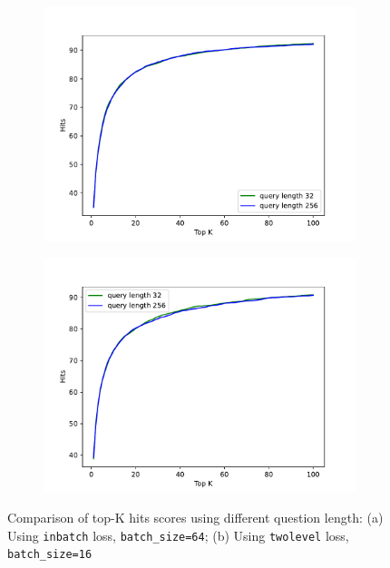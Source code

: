 \documentclass[12pt, sort&compress]{report}
\begin{document}
\begin{figure}[!htbp]
	\begin{subfigure}{.5\linewidth}
		\centering
		\includegraphics[scale=0.45]{images/PDF/experiments/inbatch_batch64.pdf}
		\caption{}
		\label{fig:19:a}
	\end{subfigure}
	\begin{subfigure}{.5\linewidth}
		\centering
		\includegraphics[scale=.45]{images/PDF/experiments/twolevel_batch16.pdf}
		\caption{}
		\label{fig:19:b}
	\end{subfigure}
	\caption{Comparison of top-K hits scores using different question length: (a) Using {\tt inbatch} loss, {\tt batch\_size=64}; (b) Using {\tt twolevel} loss, {\tt batch\_size=16}}
	\label{fig:19}
\end{figure}
\end{document}
